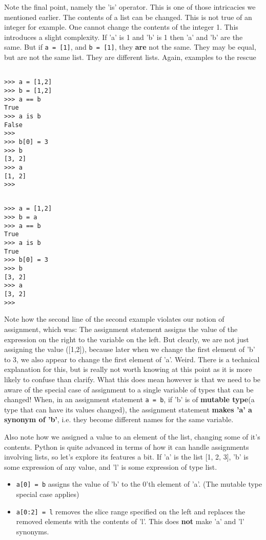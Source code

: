 Note the final point, namely the 'is' operator. This is one of those   intricacies we mentioned earlier. The contents of a list can be   changed. This is not true of an integer for example. One cannot change   the contents of the integer 1. This introduces a slight complexity. If   'a' is 1 and 'b' is 1 then 'a' and 'b' are the same. But if 
\texttt{a =   [1]}, and 
\texttt{b = [1]}, they \textbf{are} not the   same. They may be equal, but are not the same list. They are different   lists. Again, examples to the rescue
\begin{lstlisting}

>>> a = [1,2]
>>> b = [1,2]
>>> a == b
True
>>> a is b
False
>>>
>>> b[0] = 3
>>> b
[3, 2]
>>> a
[1, 2]
>>>
\end{lstlisting}
\begin{lstlisting}

>>> a = [1,2]
>>> b = a
>>> a == b
True
>>> a is b
True
>>> b[0] = 3
>>> b
[3, 2]
>>> a
[3, 2]
>>>
\end{lstlisting}

Note how the second line of the second example violates our notion   of assignment, which was: The assignment statement assigns the value of   the expression on the right to the variable on the left. But clearly,   we are not just assigning the value ([1,2]), because later when we   change the first element of 'b' to 3, we also appear to change the   first element of 'a'. Weird. There is a technical explanation for this,   but is really not worth knowing at this point as it is more likely to   confuse than clarify. What this does mean however is that we need to be   aware of the special case of assignment to a single variable of   types that can be changed!     When, in an assignment statement 
\texttt{a = b}, if 'b' is of    \textbf{mutable type}(a type that can have its values     changed), the assignment statement    \textbf{makes 'a' a synonym of 'b'}, i.e. they become    different names for the same variable.    

Also note how we assigned a value to an element of the list,   changing some of it's contents. Python is quite advanced in terms of   how it can handle assignments involving lists, so let's explore its   features a bit. If 'a' is the list [1, 2, 3], 'b' is some expression of   any value, and 'l' is some expression of type list.
\begin{itemize}
	\item 
\texttt{a[0] = b} assigns the value of 'b' to the 0'th    element of 'a'. (The mutable type special case applies)
	\item 
\texttt{a[0:2] = l} removes the slice range specified on    the left and replaces the removed elements with the contents of    'l'. This does \textbf{not} make 'a' and 'l' synonyms.
\end{itemize}

